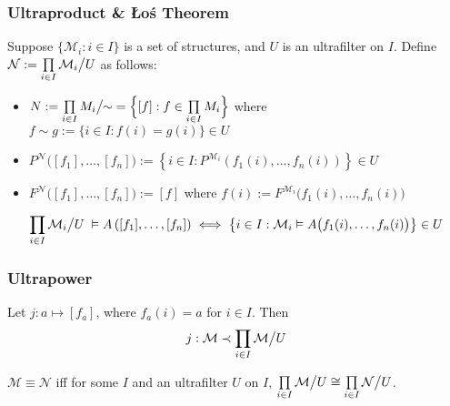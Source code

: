 \documentclass[UTF8,aspectratio=43,11pt,colorlinks,compress,openany]{beamer}%
\begin{document}
\begin{frame}\frametitle{Ultraproduct \& \L o\'s Theorem}
\setlength\abovedisplayskip{0pt}
\setlength\belowdisplayskip{0pt}
	\begin{definition}[Ultraproduct]
		Suppose $\{\mathcal{M}_i: i\in I\}$ is a set of structures, and $U$ is an ultrafilter on $I$. Define $\mathcal{N}:=\prod\limits_{i\in I}\mathcal{M}_i\big\slash U$ as follows:
		\begin{itemize}
			\item $N:=\prod\limits_{i\in I}M_i\big\slash\!\!\sim \;=\Big\{[f]: f\in\prod\limits_{i\in I} M_i\Big\}$ where $f\sim g:=\big\{i\in I: f(i)=g(i)\big\}\in U$
			\item $P^{\mathcal{N}}\big([f_1],\dots,[f_n]\big):=\left\{i\in I: P^{\mathcal{M}_i}(f_1(i),\dots,f_n(i))\right\}\in U$
			\item $F^{\mathcal{N}}\big([f_1],\dots,[f_n]\big):=[f]$ where $f(i):=F^{\mathcal{M}_i}\big(f_1(i),\dots,f_n(i)\big)$
		\end{itemize}
	\end{definition}
	\begin{theorem}[\L o\'s Theorem]
		\[\prod\limits_{i\in I}\mathcal{M}_i\big\slash U\;\vDash A\left([f_1],\dots,[f_n]\right)\iff\left\{i\in I:\mathcal{M}_i\vDash A\big(f_1(i),\dots,f_n(i)\big)\right\}\in U\]
	\end{theorem}
\end{frame}

\begin{frame}\frametitle{Ultrapower}
	\begin{block}{}
	Let $j: a\mapsto[f_a]$, where $f_a(i)=a$ for $i\in I$. Then
	\[j:\mathcal{M}\prec\prod\limits_{i\in I}\mathcal{M}\big\slash U\]
	\end{block}
	\begin{theorem}
	$\mathcal{M}\equiv\mathcal{N}$ iff for some $I$ and an ultrafilter $U$ on $I$, $\prod\limits_{i\in I}\mathcal{M}\big\slash U\cong\prod\limits_{i\in I}\mathcal{N}\big\slash U$.
	\end{theorem}
\end{frame}
\end{document}
